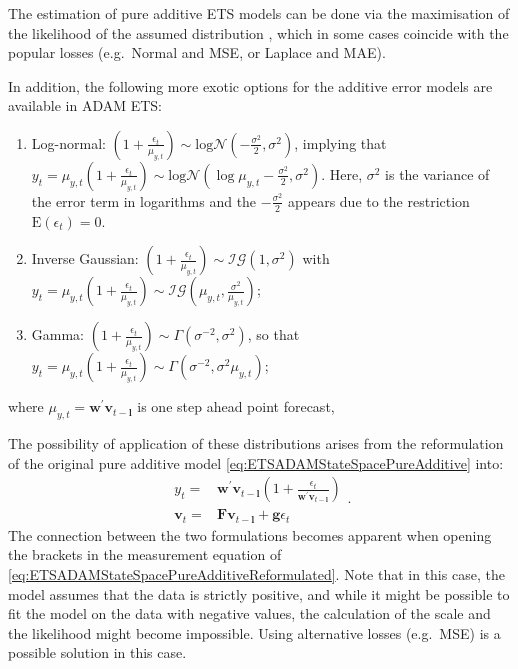 \documentclass[
]{book}
\providecommand{\tightlist}{%
  \setlength{\itemsep}{0pt}\setlength{\parskip}{0pt}}
\theoremstyle{definition}
\theoremstyle{definition}
\theoremstyle{definition}
\theoremstyle{definition}
\theoremstyle{remark}
\begin{document}
The estimation of pure additive ETS models can be done via the maximisation of the likelihood of the assumed distribution \citep[see Chapter 13 of][]{SvetunkovSBA}, which in some cases coincide with the popular losses (e.g.~Normal and MSE, or Laplace and MAE).

In addition, the following more exotic options for the additive error models are available in ADAM ETS:

\begin{enumerate}
\def\labelenumi{\arabic{enumi}.}
\tightlist
\item
  Log-normal: \(\left(1+\frac{\epsilon_t}{\mu_{y,t}} \right) \sim \text{log}\mathcal{N}\left(-\frac{\sigma^2}{2}, \sigma^2\right)\), implying that \(y_t = \mu_{y,t} \left(1+\frac{\epsilon_t}{\mu_{y,t}} \right) \sim \text{log}\mathcal{N}\left(\log\mu_{y,t} -\frac{\sigma^2}{2}, \sigma^2\right)\).
  Here, \(\sigma^2\) is the variance of the error term in logarithms and the \(-\frac{\sigma^2}{2}\) appears due to the restriction \(\text{E}(\epsilon_t)=0\).
\item
  Inverse Gaussian: \(\left(1+\frac{\epsilon_t}{\mu_{y,t}} \right) \sim \mathcal{IG}(1, \sigma^2)\) with \(y_t=\mu_{y,t} \left(1+\frac{\epsilon_t}{\mu_{y,t}} \right) \sim \mathcal{IG}\left(\mu_{y,t}, \frac{\sigma^2}{\mu_{y,t}}\right)\);
\item
  Gamma: \(\left(1+\frac{\epsilon_t}{\mu_{y,t}} \right) \sim \mathcal{\Gamma}(\sigma^{-2}, \sigma^2)\), so that \(y_t = \mu_{y,t} \left(1+\frac{\epsilon_t}{\mu_{y,t}} \right) \sim \mathcal{\Gamma}(\sigma^{-2}, \sigma^2 \mu_{y,t})\);
\end{enumerate}

where \(\mu_{y,t} = \mathbf{w}^\prime \mathbf{v}_{t-\mathbf{l}}\) is one step ahead point forecast,

The possibility of application of these distributions arises from the reformulation of the original pure additive model \eqref{eq:ETSADAMStateSpacePureAdditive} into:
\begin{equation}
  \begin{aligned}
    {y}_{t} = &\mathbf{w}^\prime \mathbf{v}_{t-\mathbf{l}}\left(1 + \frac{\epsilon_t}{\mathbf{w}^\prime \mathbf{v}_{t-\mathbf{l}}}\right) \\
    \mathbf{v}_{t} = &\mathbf{F} \mathbf{v}_{t-\mathbf{l}} + \mathbf{g} \epsilon_t
  \end{aligned}.
  \label{eq:ETSADAMStateSpacePureAdditiveReformulated}
\end{equation}
The connection between the two formulations becomes apparent when opening the brackets in the measurement equation of \eqref{eq:ETSADAMStateSpacePureAdditiveReformulated}. Note that in this case, the model assumes that the data is strictly positive, and while it might be possible to fit the model on the data with negative values, the calculation of the scale and the likelihood might become impossible. Using alternative losses (e.g.~MSE) is a possible solution in this case.
\end{document}
